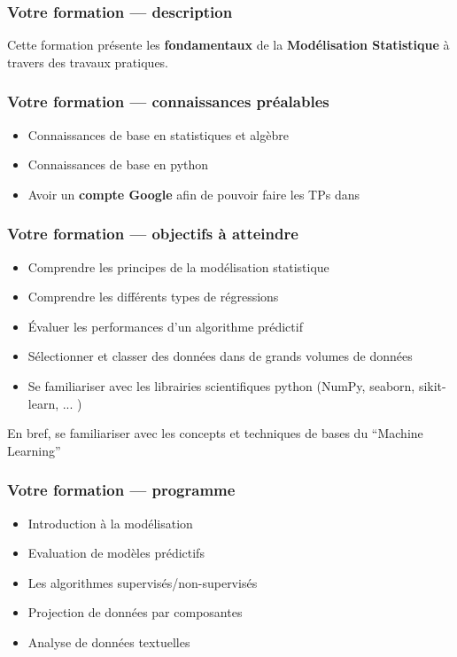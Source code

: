 
\begin{frame}
  \frametitle{Votre formation — description}
  Cette formation présente les \textbf{fondamentaux} de la \textbf{Modélisation Statistique} à travers des travaux pratiques. \\
\end{frame}

\begin{frame}
  \frametitle{Votre formation — connaissances préalables}
  \begin{itemize}
  \item Connaissances de base en statistiques et algèbre
  \item Connaissances de base en python
  \item Avoir un \textbf{compte Google} afin de pouvoir faire les TPs dans 
  \end{itemize}
\end{frame}

\begin{frame}
  \frametitle{Votre formation — objectifs à atteindre}
  \begin{itemize}
  \item Comprendre les principes de la modélisation statistique
  \item Comprendre les différents types de régressions
  \item Évaluer les performances d'un algorithme prédictif
  \item Sélectionner et classer des données dans de grands volumes de données
  \item Se familiariser avec les librairies scientifiques python (NumPy, seaborn, sikit-learn, ... )
  \end{itemize}
  En bref, se familiariser avec les concepts et techniques de bases du ``Machine Learning''
\end{frame}

\begin{frame}
  \frametitle{Votre formation — programme}
  \begin{itemize}
  \item Introduction à la modélisation
  \item Evaluation de modèles prédictifs
  \item Les algorithmes supervisés/non-supervisés
  \item Projection de données par composantes
  \item Analyse de données textuelles
  \end{itemize}
\end{frame}
